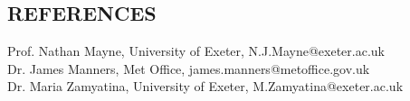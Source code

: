\documentclass[letter, margin, 10pt]{res} %
\begin{document}
\begin{resume}
 

\section{REFERENCES} 

Prof. Nathan Mayne, University of Exeter, N.J.Mayne@exeter.ac.uk \\
Dr. James Manners, Met Office, james.manners@metoffice.gov.uk \\
Dr. Maria Zamyatina, University of Exeter, M.Zamyatina@exeter.ac.uk \\
 

\end{resume}
\end{document}
